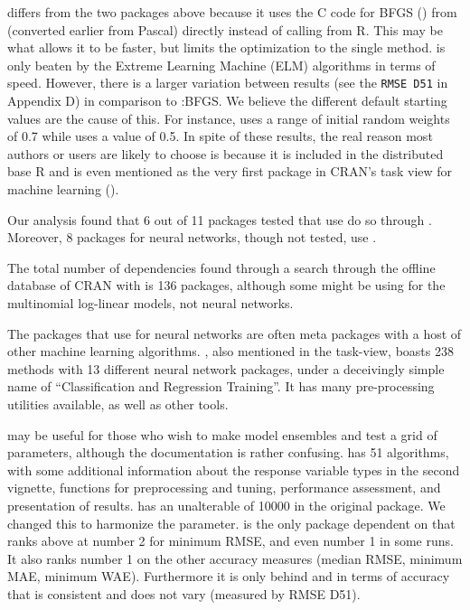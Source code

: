  \citep{R-nnet} differs from the two packages above because it
uses the \textsf{C} code for BFGS () from 
(converted earlier from Pascal) directly instead of calling 
from R. This may be what allows it to be faster, but limits the
optimization to the single method.  is only beaten by the
Extreme Learning Machine (ELM) algorithms in terms of speed. However,
there is a larger variation between results (see the \texttt{RMSE\ D51}
in Appendix D) in comparison to :BFGS. We believe the
different default starting values are the cause of this. For instance,
 uses a range of initial random weights of 0.7 while
 uses a value of 0.5. In spite of these results, the real
reason most authors or users are likely to choose  is because
it is included in the distributed base \textsf{R} and is even mentioned
as the very first package in CRAN's task view for machine learning
().

Our analysis found that 6 out of 11 packages tested that use
 do so through . Moreover, 8 packages for neural
networks, though not tested, use .

The total number of  dependencies found through a search
through the offline database of CRAN with  is 136
packages, although some might be using  for the multinomial
log-linear models, not neural networks.

The packages that use  for neural networks are often meta
packages with a host of other machine learning algorithms. 
\citep{R-caret}, also mentioned in the task-view, boasts 238 methods
with 13 different neural network packages, under a deceivingly simple
name of ``Classification and Regression Training''. It has many
pre-processing utilities available, as well as other tools.

 \citep{R-EnsembleBase} may be useful for those
who wish to make model ensembles and test a grid of parameters, although
the documentation is rather confusing. 
\citep{R-MachineShop} has 51 algorithms, with some additional
information about the response variable types in the second vignette,
functions for preprocessing and tuning, performance assessment, and
presentation of results.  \citep{R-radiant.model}
has an unalterable  of 10000 in the original package. We
changed this to harmonize the  parameter. 
\citep{R-rminer} is the only package dependent on  that ranks
above  at number 2 for minimum RMSE, and even number 1 in some
runs. It also ranks number 1 on the other accuracy measures (median
RMSE, minimum MAE, minimum WAE). Furthermore it is only behind
 and  in terms of accuracy that is
consistent and does not vary (measured by RMSE D51).

